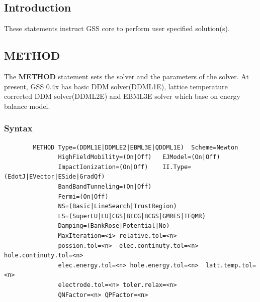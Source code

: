 \documentclass[11pt,pdftex]{article}
\begin{document}
\subsection{Introduction}
These statements instruct GSS core to perform user specified solution(s).


\subsection{METHOD}
The \textbf{METHOD} statement sets the solver and the parameters of
the solver. At present, GSS 0.4x has basic DDM solver(DDML1E),
lattice temperature corrected DDM solver(DDML2E) and EBML3E solver which base on
energy balance model.

\subsubsection*{Syntax}
\begin{verbatim}
        METHOD Type=(DDML1E|DDMLE2|EBML3E|QDDML1E)  Scheme=Newton
               HighFieldMobility=(On|Off)   EJModel=(On|Off)
               ImpactIonization=(On|Off)    II.Type=(EdotJ|EVector|ESide|GradQf)
               BandBandTunneling=(On|Off)
               Fermi=(On|Off)
               NS=(Basic|LineSearch|TrustRegion)
               LS=(SuperLU|LU|CGS|BICG|BCGS|GMRES|TFQMR)
               Damping=(BankRose|Potential|No)
               MaxIteration=<i> relative.tol=<n>
               possion.tol=<n>  elec.continuty.tol=<n>  hole.continuty.tol=<n>
               elec.energy.tol=<n> hole.energy.tol=<n>  latt.temp.tol=<n>
               electrode.tol=<n> toler.relax=<n>
               QNFactor=<n> QPFactor=<n>
\end{verbatim}
\end{document}
